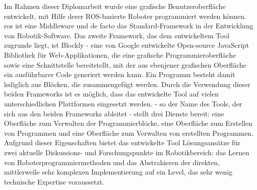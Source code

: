 Im Rahmen dieser Diplomarbeit wurde eine grafische Benutzeroberfl\"ache entwickelt, mit Hilfe derer ROS-basierte Roboter programmiert werden k\"onnen. \gls{ros} ist eine Middleware und de facto das Standard-Framework in der Entwicklung von Robotik-Software. Das zweite Framework, das dem entwickeltem Tool zugrunde liegt, ist Blockly - eine von Google entwickelte Open-source JavaScript Bibliothek f\"ur Web-Applikationen, die eine grafische Programmieroberfl\"ache sowie eine Schnittstelle bereitstellt, mit der aus ebenjener grafischen Oberfl\"ache ein ausf\"uhrbarer Code generiert werden kann. Ein Programm besteht damit lediglich aus Bl\"ocken, die zusammengef\"ugt werden. Durch die Verwendung dieser beiden Frameworks ist es m\"oglich, dass das entwickelte Tool auf vielen unterschiedlichen Plattformen eingesetzt werden. \toolname{} - so der Name des Tools, der sich aus den beiden Frameworks ableitet - stellt drei Dienste bereit: eine Oberfl\"ache zum Verwalten der Programmierbl\"ocke, eine Oberfl\"ache zum Erstellen von Programmen und eine Oberfl\"ache zum Verwalten von erstellten Programmen. Aufgrund dieser Eigenschaften bietet das entwickelte Tool L\"osungsans\"atze f\"ur zwei aktuelle Diskussions- und Forschungspunkte im Robotikbereich: das Lernen von Roboterprogrammiermethoden und das Abstrahieren der direkten, mittlerweile sehr komplexen Implementierung auf ein Level, das sehr wenig technische Expertise voraussetzt.
